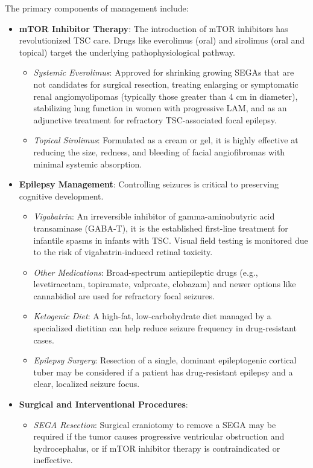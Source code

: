 The primary components of management include:
\begin{itemize}
    \item \textbf{mTOR Inhibitor Therapy}: The introduction of mTOR inhibitors has revolutionized TSC care. Drugs like everolimus (oral) and sirolimus (oral and topical) target the underlying pathophysiological pathway.
    \begin{itemize}
        \item \textit{Systemic Everolimus}: Approved for shrinking growing SEGAs that are not candidates for surgical resection, treating enlarging or symptomatic renal angiomyolipomas (typically those greater than 4 cm in diameter), stabilizing lung function in women with progressive LAM, and as an adjunctive treatment for refractory TSC-associated focal epilepsy.
        \item \textit{Topical Sirolimus}: Formulated as a cream or gel, it is highly effective at reducing the size, redness, and bleeding of facial angiofibromas with minimal systemic absorption.
    \end{itemize}
    \item \textbf{Epilepsy Management}: Controlling seizures is critical to preserving cognitive development.
    \begin{itemize}
        \item \textit{Vigabatrin}: An irreversible inhibitor of gamma-aminobutyric acid transaminase (GABA-T), it is the established first-line treatment for infantile spasms in infants with TSC. Visual field testing is monitored due to the risk of vigabatrin-induced retinal toxicity.
        \item \textit{Other Medications}: Broad-spectrum antiepileptic drugs (e.g., levetiracetam, topiramate, valproate, clobazam) and newer options like cannabidiol are used for refractory focal seizures.
        \item \textit{Ketogenic Diet}: A high-fat, low-carbohydrate diet managed by a specialized dietitian can help reduce seizure frequency in drug-resistant cases.
        \item \textit{Epilepsy Surgery}: Resection of a single, dominant epileptogenic cortical tuber may be considered if a patient has drug-resistant epilepsy and a clear, localized seizure focus.
    \end{itemize}
    \item \textbf{Surgical and Interventional Procedures}:
    \begin{itemize}
        \item \textit{SEGA Resection}: Surgical craniotomy to remove a SEGA may be required if the tumor causes progressive ventricular obstruction and hydrocephalus, or if mTOR inhibitor therapy is contraindicated or ineffective.

\end{itemize}
\end{itemize}
